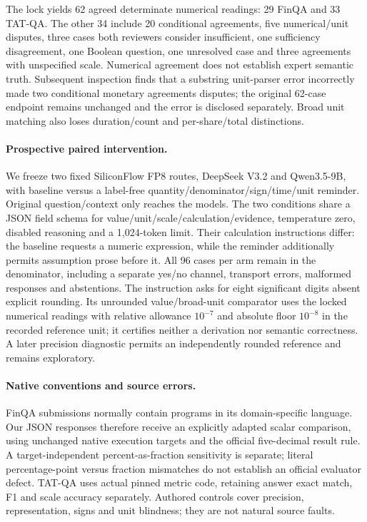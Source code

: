 The lock yields 62 agreed determinate numerical readings: 29 FinQA and 33 TAT-QA. The other 34 include 20 conditional agreements, five numerical/unit disputes, three cases both reviewers consider insufficient, one sufficiency disagreement, one Boolean question, one unresolved case and three agreements with unspecified scale. Numerical agreement does not establish expert semantic truth. Subsequent inspection finds that a substring unit-parser error incorrectly made two conditional monetary agreements disputes; the original 62-case endpoint remains unchanged and the error is disclosed separately. Broad unit matching also loses duration/count and per-share/total distinctions.

\paragraph{Prospective paired intervention.} We freeze two fixed SiliconFlow FP8 routes, DeepSeek V3.2 and Qwen3.5-9B, with baseline versus a label-free quantity/denominator/sign/time/unit reminder. Original question/context only reaches the models. The two conditions share a JSON field schema for value/unit/scale/calculation/evidence, temperature zero, disabled reasoning and a 1,024-token limit. Their calculation instructions differ: the baseline requests a numeric expression, while the reminder additionally permits assumption prose before it. All 96 cases per arm remain in the denominator, including a separate yes/no channel, transport errors, malformed responses and abstentions. The instruction asks for eight significant digits absent explicit rounding. Its unrounded value/broad-unit comparator uses the locked numerical readings with relative allowance $10^{-7}$ and absolute floor $10^{-8}$ in the recorded reference unit; it certifies neither a derivation nor semantic correctness. A later precision diagnostic permits an independently rounded reference and remains exploratory.

\paragraph{Native conventions and source errors.} FinQA submissions normally contain programs in its domain-specific language. Our JSON responses therefore receive an explicitly adapted scalar comparison, using unchanged native execution targets and the official five-decimal result rule. A target-independent percent-as-fraction sensitivity is separate; literal percentage-point versus fraction mismatches do not establish an official evaluator defect. TAT-QA uses actual pinned metric code, retaining answer exact match, F1 and scale accuracy separately. Authored controls cover precision, representation, signs and unit blindness; they are not natural source faults.

